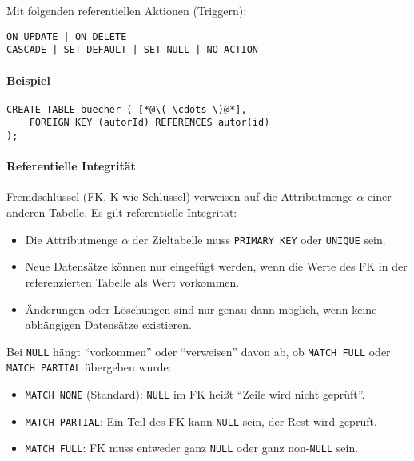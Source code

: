 					Mit folgenden referentiellen Aktionen (Triggern):
					\begin{lstlisting}
ON UPDATE | ON DELETE
CASCADE | SET DEFAULT | SET NULL | NO ACTION
            		\end{lstlisting}

				\paragraph{Beispiel}
					\begin{lstlisting}
CREATE TABLE buecher ( [*@\( \cdots \)@*],
	FOREIGN KEY (autorId) REFERENCES autor(id)
);
            		\end{lstlisting}

				\paragraph{Referentielle Integrität}
					Fremdschlüssel (FK, K wie Schlüssel) verweisen auf die Attributmenge \( \alpha \) einer anderen Tabelle. Es gilt referentielle Integrität:
					\begin{itemize}
						\item Die Attributmenge \(\alpha\) der Zieltabelle muss \lstinline|PRIMARY KEY| oder \lstinline|UNIQUE| sein.
						\item Neue Datensätze können nur eingefügt werden, wenn die Werte des FK in der referenzierten Tabelle als Wert vorkommen.
						\item Änderungen oder Löschungen sind nur genau dann möglich, wenn keine abhängigen Datensätze existieren.
					\end{itemize}

					Bei \lstinline|NULL| hängt \enquote{vorkommen} oder \enquote{verweisen} davon ab, ob \lstinline|MATCH FULL| oder \lstinline|MATCH PARTIAL| übergeben wurde:
					\begin{itemize}
						\item \lstinline|MATCH NONE| (Standard): \lstinline|NULL| im FK heißt \enquote{Zeile wird nicht geprüft}.
						\item \lstinline|MATCH PARTIAL|: Ein Teil des FK kann \lstinline|NULL| sein, der Rest wird geprüft.
						\item \lstinline|MATCH FULL|: FK muss entweder ganz \lstinline|NULL| oder ganz non-\lstinline|NULL| sein.
					\end{itemize}

